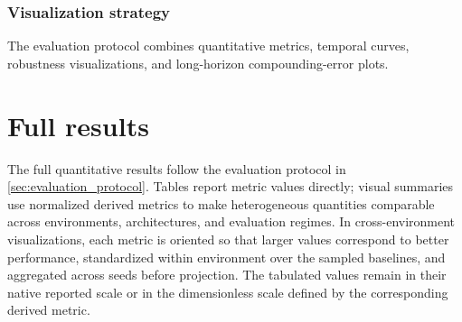\documentclass{article}
\theoremstyle{plain}
\theoremstyle{definition}
\theoremstyle{remark}
\begin{document}
\begin{table}[h!]
  \centering
  \footnotesize
  \caption{Claim-level evidence summary.}
  \label{tab:claim_evidence_summary}
\end{table}

\subsubsection{Visualization strategy}

The evaluation protocol combines quantitative metrics, temporal curves, robustness visualizations, and long-horizon compounding-error plots.


\section{Full results}
\label{app:full-results}

The full quantitative results follow the evaluation protocol in \autoref{sec:evaluation_protocol}. Tables report metric values directly; visual summaries use normalized derived metrics to make heterogeneous quantities comparable across environments, architectures, and evaluation regimes. In cross-environment visualizations, each metric is oriented so that larger values correspond to better performance, standardized within environment over the sampled baselines, and aggregated across seeds before projection. The tabulated values remain in their native reported scale or in the dimensionless scale defined by the corresponding derived metric.
\end{document}
